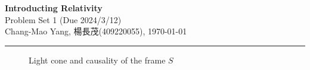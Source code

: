 \documentclass[12pt]{article}%
\begin{document}
\begin{center}
\textbf{\Large Introducting Relativity}
\\\vspace{10pt}
{Problem Set 1 (Due 2024/3/12)}
\\\vspace{10pt}
Chang-Mao Yang, 楊長茂(409220055), \today

\vspace{5pt}
\hrule
\end{center}

\begin{figure}[h]
\centering

\caption{Light cone and causality of the frame $S$}
\end{figure}
\end{document}
